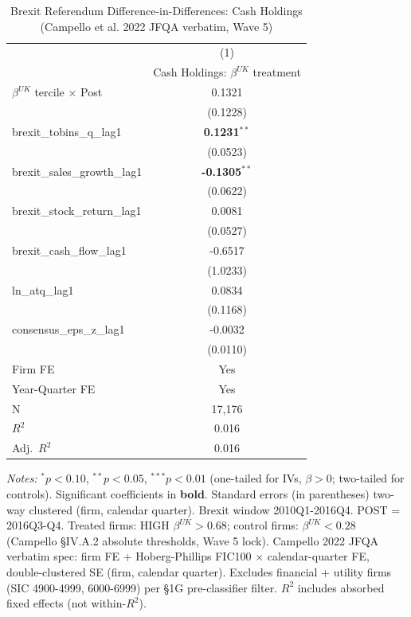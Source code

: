 \begin{landscape}
\begin{table}[H]
\setlength{\tabcolsep}{3pt}
\renewcommand{\arraystretch}{0.85}
\centering
\caption{Brexit Referendum Difference-in-Differences: Cash Holdings (Campello et al. 2022 JFQA verbatim, Wave 5)}
\label{tab:h1_5_brexit_did}
\scriptsize
\begin{tabular}{lc}
\toprule
 & (1) \\
 & Cash Holdings: $\beta^{UK}$ treatment \\
\midrule
$\beta^{UK}$ tercile $\times$ Post & 0.1321 \\
 & (0.1228) \\
\midrule
brexit\_tobins\_q\_lag1 & \textbf{0.1231}$^{**}$ \\
 & (0.0523) \\
brexit\_sales\_growth\_lag1 & \textbf{-0.1305}$^{**}$ \\
 & (0.0622) \\
brexit\_stock\_return\_lag1 & 0.0081 \\
 & (0.0527) \\
brexit\_cash\_flow\_lag1 & -0.6517 \\
 & (1.0233) \\
ln\_atq\_lag1 & 0.0834 \\
 & (0.1168) \\
consensus\_eps\_z\_lag1 & -0.0032 \\
 & (0.0110) \\
\midrule
Firm FE & Yes \\
Year-Quarter FE & Yes \\
\midrule
N & 17,176 \\
$R^2$ & 0.016 \\
Adj.~$R^2$ & 0.016 \\
\bottomrule
\end{tabular}
\begin{minipage}{\linewidth}
\vspace{2pt}\scriptsize
\textit{Notes:} $^{*}p<0.10$, $^{**}p<0.05$, $^{***}p<0.01$ (one-tailed for IVs, $\beta > 0$; two-tailed for controls).
 Significant coefficients in \textbf{bold}.
 Standard errors (in parentheses) two-way clustered (firm, calendar quarter).
 Brexit window 2010Q1-2016Q4. POST = 2016Q3-Q4. Treated firms: HIGH $\beta^{UK} > 0.68$; control firms: $\beta^{UK} < 0.28$ (Campello \S IV.A.2 absolute thresholds, Wave 5 lock). Campello 2022 JFQA verbatim spec: firm FE + Hoberg-Phillips FIC100 $\times$ calendar-quarter FE, double-clustered SE (firm, calendar quarter). Excludes financial + utility firms (SIC 4900-4999, 6000-6999) per \S 1G pre-classifier filter.
 $R^2$ includes absorbed fixed effects (not within-$R^2$).
\end{minipage}
\end{table}
\end{landscape}